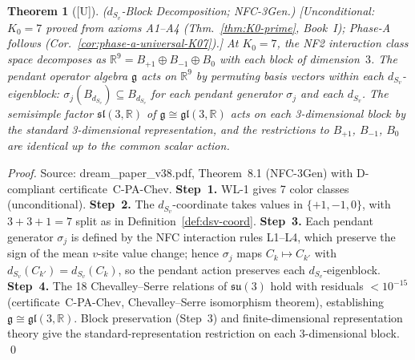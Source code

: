 \documentclass[12pt,oneside]{amsbook}
\theoremstyle{plain}
\newtheorem{theorem}{Theorem}[section]
\theoremstyle{definition}
\theoremstyle{remark}
\newcommand{\status}[1]{\textup{[#1]}}
\begin{document}
\begin{theorem}[\status{U}]\label{thm:dSv-block-decomp}
\textup{($d_{S_v}$-Block Decomposition; NFC-3Gen.)}
\textup{[Unconditional: $K_0=7$ proved from axioms A1--A4 (Thm.~\ref{thm:K0-prime}, Book~I);
Phase-A follows (Cor.~\ref{cor:phase-a-universal-K07}).]}
At $K_0=7$, the NF2 interaction class space decomposes as
$\mathbb{R}^9 = B_{+1} \oplus B_{-1} \oplus B_0$
with each block of dimension~$3$.  The pendant operator algebra
$\mathfrak{g}$ acts on $\mathbb{R}^9$ by permuting basis vectors
within each $d_{S_v}$-eigenblock:
$\sigma_j(B_{d_{S_v}}) \subseteq B_{d_{S_v}}$ for each pendant
generator $\sigma_j$ and each $d_{S_v}$.  The semisimple factor
$\mathfrak{sl}(3,\mathbb{R})$ of $\mathfrak{g} \cong
\mathfrak{gl}(3,\mathbb{R})$ acts on each 3-dimensional block by
the standard 3-dimensional representation, and the restrictions to
$B_{+1}$, $B_{-1}$, $B_0$ are identical up to the common scalar
action.
\end{theorem}

\begin{proof}
Source: dream\_paper\_v38.pdf, Theorem~8.1 (NFC-3Gen) with
D-compliant certificate~C-PA-Chev.
\textbf{Step~1.}  WL-1 gives 7 color classes (unconditional).
\textbf{Step~2.}  The $d_{S_v}$-coordinate takes values in
$\{+1,-1,0\}$, with $3+3+1=7$ split as in
Definition~\ref{def:dsv-coord}.
\textbf{Step~3.}  Each pendant generator $\sigma_j$ is defined
by the NFC interaction rules L1--L4, which preserve the sign of
the mean $v$-site value change; hence $\sigma_j$ maps $C_k \mapsto
C_{k'}$ with $d_{S_v}(C_{k'})=d_{S_v}(C_k)$, so the pendant
action preserves each $d_{S_v}$-eigenblock.
\textbf{Step~4.}  The 18 Chevalley--Serre relations of
$\mathfrak{su}(3)$ hold with residuals $<10^{-15}$
(certificate~C-PA-Chev, Chevalley--Serre isomorphism theorem),
establishing $\mathfrak{g} \cong \mathfrak{gl}(3,\mathbb{R})$.
Block preservation (Step~3) and finite-dimensional representation
theory give the standard-representation restriction on each
$3$-dimensional block. \qed
\end{proof}
\end{document}
